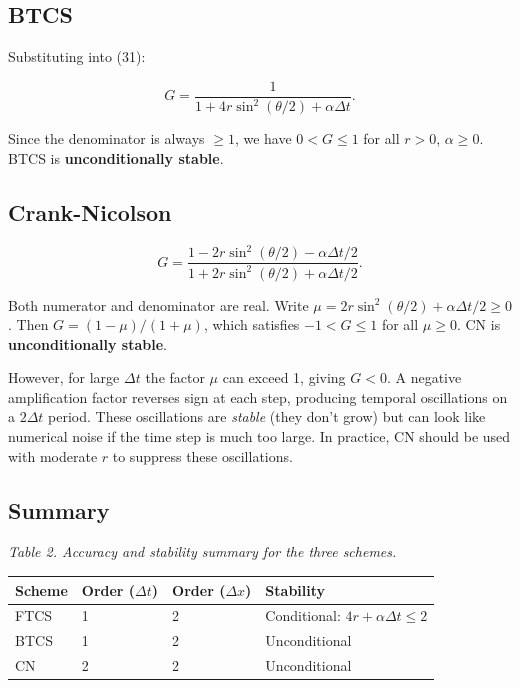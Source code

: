 \documentclass[11pt,a4paper]{article}
\begin{document}
\subsection{BTCS}

Substituting into (31):

\begin{equation}
G = \frac{1}{1 + 4r\sin^2(\theta/2) + \alpha\Delta t}. \tag{42}
\end{equation}

Since the denominator is always $\ge 1$, we have $0 < G \le 1$ for all $r > 0$, $\alpha\ge 0$. BTCS is \textbf{unconditionally stable}.

\subsection{Crank-Nicolson}

\begin{equation}
G = \frac{1 - 2r\sin^2(\theta/2) - \alpha\Delta t/2}{1 + 2r\sin^2(\theta/2) + \alpha\Delta t/2}. \tag{43}
\end{equation}

Both numerator and denominator are real. Write $\mu = 2r\sin^2(\theta/2) + \alpha\Delta t/2 \ge 0$. Then $G = (1-\mu)/(1+\mu)$, which satisfies $-1 < G \le 1$ for all $\mu \ge 0$. CN is \textbf{unconditionally stable}.

However, for large $\Delta t$ the factor $\mu$ can exceed 1, giving $G < 0$. A negative amplification factor reverses sign at each step, producing temporal oscillations on a $2\Delta t$ period. These oscillations are \emph{stable} (they don't grow) but can look like numerical noise if the time step is much too large. In practice, CN should be used with moderate $r$ to suppress these oscillations.

\subsection{Summary}

\emph{Table 2. Accuracy and stability summary for the three schemes.}

\begin{center}
\renewcommand{\arraystretch}{1.15}
\begin{tabular}{|p{}|p{}|p{}|p{}|}
\hline
Scheme & Order ($\Delta t$) & Order ($\Delta x$) & Stability \\
\hline
FTCS & 1 & 2 & Conditional: $4r+\alpha\Delta t\le 2$ \\
BTCS & 1 & 2 & Unconditional \\
CN & 2 & 2 & Unconditional \\
\hline
\end{tabular}
\end{center}
\end{document}
